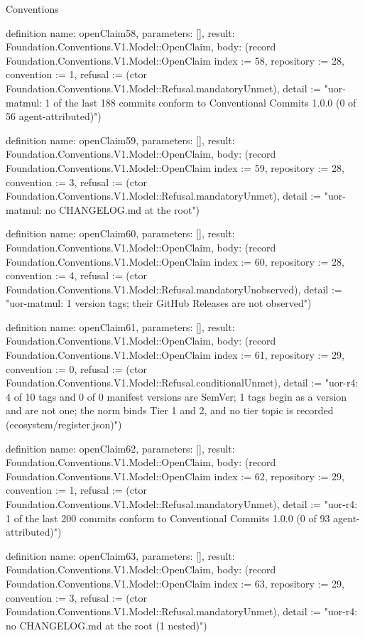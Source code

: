 \begin{lexlean}{Conventions}
\begin{semanticmodule}
definition{
  name: openClaim58,
  parameters: [],
  result: Foundation.Conventions.V1.Model::OpenClaim,
  body: (record Foundation.Conventions.V1.Model::OpenClaim {index := 58, repository := 28, convention := 1, refusal := (ctor Foundation.Conventions.V1.Model::Refusal.mandatoryUnmet), detail := "uor-matmul: 1 of the last 188 commits conform to Conventional Commits 1.0.0 (0 of 56 agent-attributed)"})
}

definition{
  name: openClaim59,
  parameters: [],
  result: Foundation.Conventions.V1.Model::OpenClaim,
  body: (record Foundation.Conventions.V1.Model::OpenClaim {index := 59, repository := 28, convention := 3, refusal := (ctor Foundation.Conventions.V1.Model::Refusal.mandatoryUnmet), detail := "uor-matmul: no CHANGELOG.md at the root"})
}

definition{
  name: openClaim60,
  parameters: [],
  result: Foundation.Conventions.V1.Model::OpenClaim,
  body: (record Foundation.Conventions.V1.Model::OpenClaim {index := 60, repository := 28, convention := 4, refusal := (ctor Foundation.Conventions.V1.Model::Refusal.mandatoryUnobserved), detail := "uor-matmul: 1 version tags; their GitHub Releases are not observed"})
}

definition{
  name: openClaim61,
  parameters: [],
  result: Foundation.Conventions.V1.Model::OpenClaim,
  body: (record Foundation.Conventions.V1.Model::OpenClaim {index := 61, repository := 29, convention := 0, refusal := (ctor Foundation.Conventions.V1.Model::Refusal.conditionalUnmet), detail := "uor-r4: 4 of 10 tags and 0 of 0 manifest versions are SemVer; 1 tags begin as a version and are not one; the norm binds Tier 1 and 2, and no tier topic is recorded (ecosystem/register.json)"})
}

definition{
  name: openClaim62,
  parameters: [],
  result: Foundation.Conventions.V1.Model::OpenClaim,
  body: (record Foundation.Conventions.V1.Model::OpenClaim {index := 62, repository := 29, convention := 1, refusal := (ctor Foundation.Conventions.V1.Model::Refusal.mandatoryUnmet), detail := "uor-r4: 1 of the last 200 commits conform to Conventional Commits 1.0.0 (0 of 93 agent-attributed)"})
}

definition{
  name: openClaim63,
  parameters: [],
  result: Foundation.Conventions.V1.Model::OpenClaim,
  body: (record Foundation.Conventions.V1.Model::OpenClaim {index := 63, repository := 29, convention := 3, refusal := (ctor Foundation.Conventions.V1.Model::Refusal.mandatoryUnmet), detail := "uor-r4: no CHANGELOG.md at the root (1 nested)"})
}


\end{semanticmodule}
\end{lexlean}
